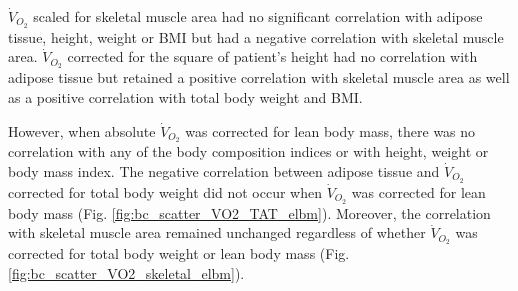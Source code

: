 $\dot{V}_{O_2}$ scaled for skeletal muscle area had no significant correlation with adipose tissue, height, weight or BMI but had a negative correlation with skeletal muscle area. 
$\dot{V}_{O_2}$ corrected for the square of patient's height had no correlation with adipose tissue but retained a positive correlation with skeletal muscle area as well as a positive correlation with total body weight and BMI. 

However, when absolute $\dot{V}_{O_2}$ was corrected for lean body mass, there was no correlation with any of the body composition indices or with height, weight or body mass index. 
The negative correlation between adipose tissue and $\dot{V}_{O_2}$ corrected for total body weight did not occur when $\dot{V}_{O_2}$ was corrected for lean body mass (Fig. \ref{fig:bc_scatter_VO2_TAT_elbm}). 
Moreover, the correlation with skeletal muscle area remained unchanged regardless of whether $\dot{V}_{O_2}$ was corrected for total body weight or lean body mass (Fig. \ref{fig:bc_scatter_VO2_skeletal_elbm}).

